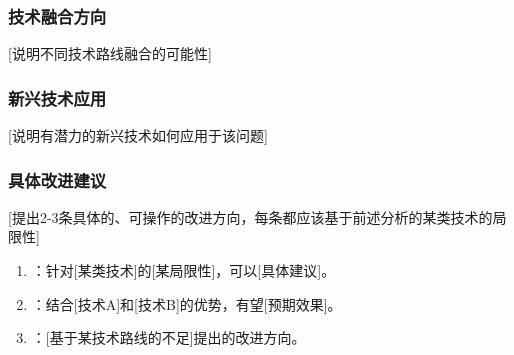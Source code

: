 \documentclass[journal]{IEEEtran}
\begin{document}
\subsubsection{技术融合方向}
[说明不同技术路线融合的可能性]

\subsubsection{新兴技术应用}
[说明有潜力的新兴技术如何应用于该问题]

\subsubsection{具体改进建议}
[提出2-3条具体的、可操作的改进方向，每条都应该基于前述分析的某类技术的局限性]

\begin{enumerate}
    \item [改进方向1]：针对[某类技术]的[某局限性]，可以[具体建议]。
    \item [改进方向2]：结合[技术A]和[技术B]的优势，有望[预期效果]。
    \item [改进方向3]：[基于某技术路线的不足]提出的改进方向。
\end{enumerate}



\end{document}

